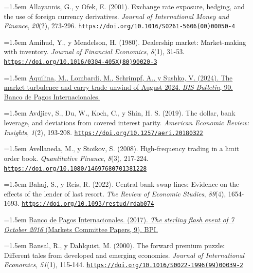 \documentclass[10pt,a4paper]{article}
\begin{document}
\noindent\hangindent=1.5em Allayannis, G., y Ofek, E. (2001). Exchange rate exposure, hedging, and the use of foreign currency derivatives. \textit{Journal of International Money and Finance}, \textit{20}(2), 273-296. \href{https://doi.org/10.1016/S0261-5606(00)00050-4}{\nolinkurl{https://doi.org/10.1016/S0261-5606(00)00050-4}}

\noindent\hangindent=1.5em Amihud, Y., y Mendelson, H. (1980). Dealership market: Market-making with inventory. \textit{Journal of Financial Economics}, \textit{8}(1), 31-53. \href{https://doi.org/10.1016/0304-405X(80)90020-3}{\nolinkurl{https://doi.org/10.1016/0304-405X(80)90020-3}}

\noindent\hangindent=1.5em \href{https://www.bis.org/publ/bisbull90.htm}{Aquilina, M., Lombardi, M., Schrimpf, A., y Sushko, V. (2024). The market turbulence and carry trade unwind of August 2024. \textit{BIS Bulletin}, 90. Banco de Pagos Internacionales.}

\noindent\hangindent=1.5em Avdjiev, S., Du, W., Koch, C., y Shin, H. S. (2019). The dollar, bank leverage, and deviations from covered interest parity. \textit{American Economic Review: Insights}, \textit{1}(2), 193-208. \href{https://doi.org/10.1257/aeri.20180322}{\nolinkurl{https://doi.org/10.1257/aeri.20180322}}

\noindent\hangindent=1.5em Avellaneda, M., y Stoikov, S. (2008). High-frequency trading in a limit order book. \textit{Quantitative Finance}, \textit{8}(3), 217-224. \href{https://doi.org/10.1080/14697680701381228}{\nolinkurl{https://doi.org/10.1080/14697680701381228}}

\noindent\hangindent=1.5em Bahaj, S., y Reis, R. (2022). Central bank swap lines: Evidence on the effects of the lender of last resort. \textit{The Review of Economic Studies}, \textit{89}(4), 1654-1693. \href{https://doi.org/10.1093/restud/rdab074}{\nolinkurl{https://doi.org/10.1093/restud/rdab074}}

\noindent\hangindent=1.5em \href{https://www.bis.org/publ/mktc09.htm}{Banco de Pagos Internacionales. (2017). \textit{The sterling flash event of 7 October 2016} (Markets Committee Papers, 9). BPI.}

\noindent\hangindent=1.5em Bansal, R., y Dahlquist, M. (2000). The forward premium puzzle: Different tales from developed and emerging economies. \textit{Journal of International Economics}, \textit{51}(1), 115-144. \href{https://doi.org/10.1016/S0022-1996(99)00039-2}{\nolinkurl{https://doi.org/10.1016/S0022-1996(99)00039-2}}
\end{document}
